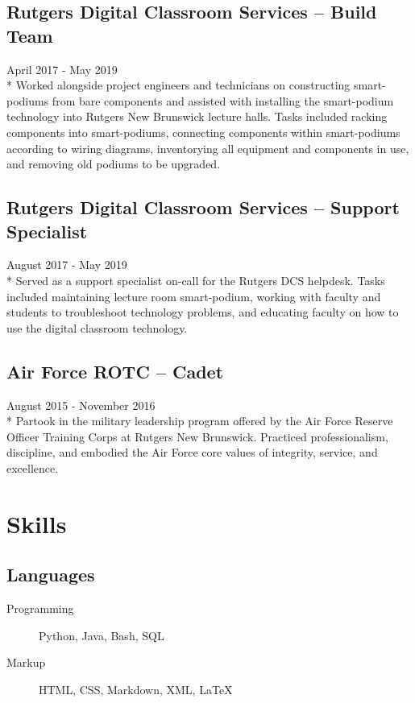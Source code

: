 \documentclass{article}
\begin{document}
\begin{samepage}
\subsection{Rutgers Digital Classroom Services -- Build Team}
April 2017 - May 2019\\*
Worked alongside project engineers and technicians on constructing smart-podiums from bare components and assisted with installing the smart-podium technology into Rutgers New Brunswick lecture halls. Tasks included racking components into smart-podiums, connecting components within smart-podiums according to wiring diagrams, inventorying all equipment and components in use, and removing old podiums to be upgraded.

\subsection{Rutgers Digital Classroom Services -- Support Specialist}
August 2017 - May 2019\\*
Served as a support specialist on-call for the Rutgers DCS helpdesk. Tasks included maintaining lecture room smart-podium, working with faculty and students to troubleshoot technology problems, and educating faculty on how to use the digital classroom technology.

\subsection{Air Force ROTC -- Cadet}
August 2015 - November 2016\\*
Partook in the military leadership program offered by the Air Force Reserve Officer Training Corps at Rutgers New Brunswick. Practiced professionalism, discipline, and embodied the Air Force core values of integrity, service, and excellence.

\section{Skills}

\iffalse
\subsection{Soft Skills}
Technical Writing/Documentation Writing, Router Configuration, Server Administration, Raspberry Pi, Arduino
\fi

\subsection{Languages}
\begin{description}
\item[Programming] Python, Java, Bash, SQL
\item[Markup] HTML, CSS, Markdown, XML, {\LaTeX}
\end{description}


\end{samepage}
\end{document}
